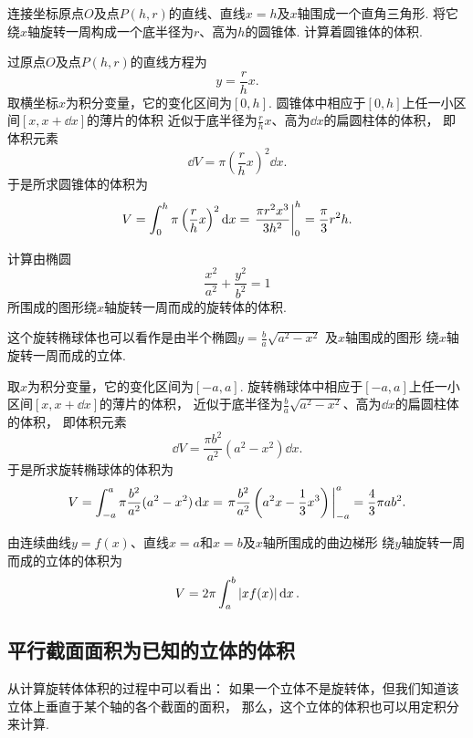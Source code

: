 \begin{example}
连接坐标原点\(O\)及点\(P(h,r)\)的直线、直线\(x=h\)及\(x\)轴围成一个直角三角形.
将它绕\(x\)轴旋转一周构成一个底半径为\(r\)、高为\(h\)的圆锥体.
计算着圆锥体的体积.
\begin{solution}
过原点\(O\)及点\(P(h,r)\)的直线方程为\[
	y = \frac{r}{h} x.
\]
取横坐标\(x\)为积分变量，它的变化区间为\([0,h]\).
圆锥体中相应于\([0,h]\)上任一小区间\([x,x+\dd{x}]\)的薄片的体积
近似于底半径为\(\frac{r}{h} x\)、高为\(\dd{x}\)的扁圆柱体的体积，
即体积元素\[
	\dd{V} = \pi \left(\frac{r}{h} x\right)^2 \dd{x}.
\]
于是所求圆锥体的体积为\[
	V = \int_0^h \pi \left(\frac{r}{h} x\right)^2 \dd{x}
	= \eval{\frac{\pi r^2 x^3}{3 h^2}}_0^h
	= \frac\pi3 r^2 h.
\]
\end{solution}
\end{example}

\begin{example}
计算由椭圆\[
	\frac{x^2}{a^2}+\frac{y^2}{b^2}=1
\]所围成的图形绕\(x\)轴旋转一周而成的旋转体的体积.
\begin{solution}
这个旋转椭球体也可以看作是由半个椭圆\(y = \frac{b}{a} \sqrt{a^2-x^2}\)
及\(x\)轴围成的图形
绕\(x\)轴旋转一周而成的立体.

取\(x\)为积分变量，它的变化区间为\([-a,a]\).
旋转椭球体中相应于\([-a,a]\)上任一小区间\([x,x+\dd{x}]\)的薄片的体积，
近似于底半径为\(\frac{b}{a} \sqrt{a^2-x^2}\)、高为\(\dd{x}\)的扁圆柱体的体积，
即体积元素\[
	\dd{V} = \frac{\pi b^2}{a^2} (a^2-x^2) \dd{x}.
\]
于是所求旋转椭球体的体积为\[
	V = \int_{-a}^a \pi \frac{b^2}{a^2} (a^2-x^2) \dd{x}
	= \eval{\pi \frac{b^2}{a^2} \left(a^2x-\frac13x^3\right)}_{-a}^a
	= \frac43 \pi a b^2.
\]
\end{solution}
\end{example}

由连续曲线\(y=f(x)\)、直线\(x=a\)和\(x=b\)及\(x\)轴所围成的曲边梯形
绕\(y\)轴旋转一周而成的立体的体积为
\begin{equation}\label{equation:定积分.曲边梯形绕y轴旋转体的体积}
	V = 2\pi \int_a^b \abs{x f(x)} \dd{x}.
\end{equation}

\subsection{平行截面面积为已知的立体的体积}
从计算旋转体体积的过程中可以看出：
如果一个立体不是旋转体，但我们知道该立体上垂直于某个轴的各个截面的面积，
那么，这个立体的体积也可以用定积分来计算.

